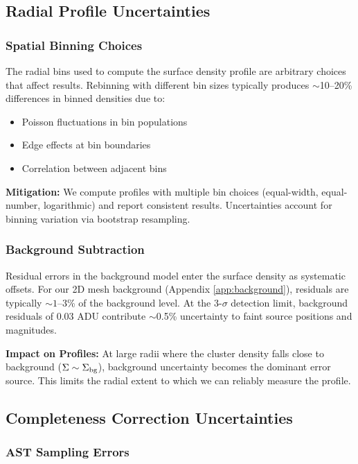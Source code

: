 \documentclass[linenumbers,trackchanges,twocolumn]{aastex701}
\begin{document}
\subsection{Radial Profile Uncertainties}

\subsubsection{Spatial Binning Choices}

The radial bins used to compute the surface density profile are arbitrary choices that affect results. Rebinning with different bin sizes typically produces $\sim$10--20\% differences in binned densities due to:
\begin{itemize}
\item Poisson fluctuations in bin populations
\item Edge effects at bin boundaries
\item Correlation between adjacent bins
\end{itemize}

\textbf{Mitigation:} We compute profiles with multiple bin choices (equal-width, equal-number, logarithmic) and report consistent results. Uncertainties account for binning variation via bootstrap resampling.

\subsubsection{Background Subtraction}

Residual errors in the background model enter the surface density as systematic offsets. For our 2D mesh background (Appendix \ref{app:background}), residuals are typically $\sim 1$--3\% of the background level. At the 3-$\sigma$ detection limit, background residuals of 0.03 ADU contribute $\sim$0.5\% uncertainty to faint source positions and magnitudes.

\textbf{Impact on Profiles:} At large radii where the cluster density falls close to background ($\Sigma \sim \Sigma_{\rm bg}$), background uncertainty becomes the dominant error source. This limits the radial extent to which we can reliably measure the profile.

\subsection{Completeness Correction Uncertainties}

\subsubsection{AST Sampling Errors}
\end{document}
